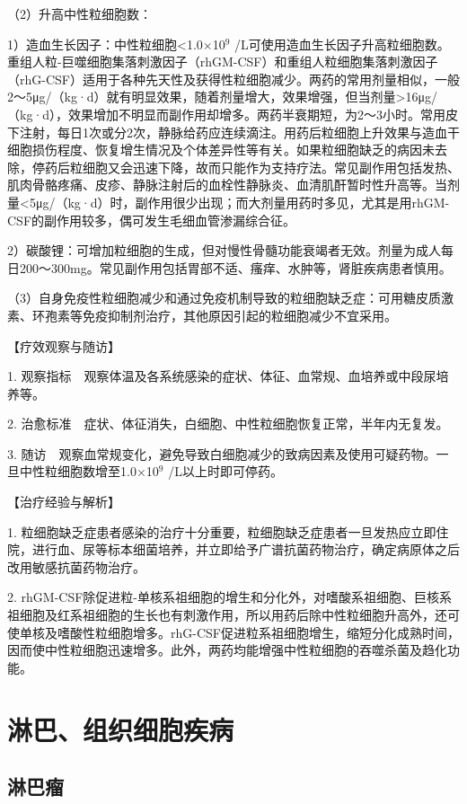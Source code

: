 （2）升高中性粒细胞数：

1）造血生长因子：中性粒细胞<1.0×10$^{9}$
/L可使用造血生长因子升高粒细胞数。重组人粒-巨噬细胞集落刺激因子（rhGM-CSF）和重组人粒细胞集落刺激因子（rhG-CSF）适用于各种先天性及获得性粒细胞减少。两药的常用剂量相似，一般2～5μg/（kg·d）就有明显效果，随着剂量增大，效果增强，但当剂量\textgreater{}16μg/（kg·d），效果增加不明显而副作用却增多。两药半衰期短，为2～3小时。常用皮下注射，每日1次或分2次，静脉给药应连续滴注。用药后粒细胞上升效果与造血干细胞损伤程度、恢复增生情况及个体差异性等有关。如果粒细胞缺乏的病因未去除，停药后粒细胞又会迅速下降，故而只能作为支持疗法。常见副作用包括发热、肌肉骨骼疼痛、皮疹、静脉注射后的血栓性静脉炎、血清肌酐暂时性升高等。当剂量<5μg/（kg·d）时，副作用很少出现；而大剂量用药时多见，尤其是用rhGM-CSF的副作用较多，偶可发生毛细血管渗漏综合征。

2）碳酸锂：可增加粒细胞的生成，但对慢性骨髓功能衰竭者无效。剂量为成人每日200～300mg。常见副作用包括胃部不适、瘙痒、水肿等，肾脏疾病患者慎用。

（3）自身免疫性粒细胞减少和通过免疫机制导致的粒细胞缺乏症：可用糖皮质激素、环孢素等免疫抑制剂治疗，其他原因引起的粒细胞减少不宜采用。

【疗效观察与随访】

1.
观察指标　观察体温及各系统感染的症状、体征、血常规、血培养或中段尿培养等。

2. 治愈标准　症状、体征消失，白细胞、中性粒细胞恢复正常，半年内无复发。

3.
随访　观察血常规变化，避免导致白细胞减少的致病因素及使用可疑药物。一旦中性粒细胞数增至1.0×10$^{9}$
/L以上时即可停药。

【治疗经验与解析】

1.
粒细胞缺乏症患者感染的治疗十分重要，粒细胞缺乏症患者一旦发热应立即住院，进行血、尿等标本细菌培养，并立即给予广谱抗菌药物治疗，确定病原体之后改用敏感抗菌药物治疗。

2.
rhGM-CSF除促进粒-单核系祖细胞的增生和分化外，对嗜酸系祖细胞、巨核系祖细胞及红系祖细胞的生长也有刺激作用，所以用药后除中性粒细胞升高外，还可使单核及嗜酸性粒细胞增多。rhG-CSF促进粒系祖细胞增生，缩短分化成熟时间，因而使中性粒细胞迅速增多。此外，两药均能增强中性粒细胞的吞噬杀菌及趋化功能。

\section{淋巴、组织细胞疾病}

\subsection{淋巴瘤}

